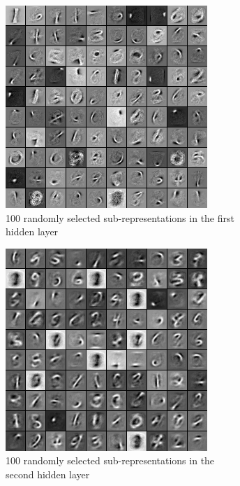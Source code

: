 \documentclass[a4paper,11pt]{report}
\begin{document}
		\begin{figure}[H]
			\begin{center}
				\begin{subfigure}{.7\textwidth}
					\begin{center}
						\includegraphics[width=.6\linewidth]{Images/Experience/3L1000_all_layer_0.png}
						\caption{100 randomly selected sub-representations in the first hidden layer}
						\label{fig:1000_layer0}
					\end{center}
				\end{subfigure}
				\begin{subfigure}{.7\textwidth}
					\begin{center}
						\includegraphics[width=.6\linewidth]{Images/Experience/3L1000_all_layer_1.png}
						\caption{100 randomly selected sub-representations in the second hidden layer}
						\label{fig:1000_layer1}
					\end{center}
				\end{subfigure}
				\begin{subfigure}{.7\textwidth}

\end{subfigure}
\end{center}
\end{figure}
\end{document}
